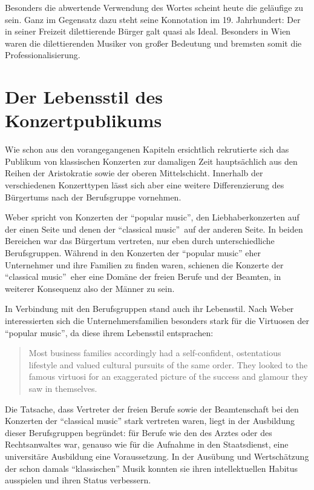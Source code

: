 \documentclass[a4paper, german, oneside]{scrbook}
\begin{document}
Besonders die abwertende Verwendung des Wortes scheint heute die geläufige zu sein. Ganz im Gegensatz dazu steht seine Konnotation im 19. Jahrhundert: Der in seiner Freizeit dilettierende Bürger galt quasi als Ideal. Besonders in Wien waren die dilettierenden Musiker von großer Bedeutung und bremsten somit die Professionalisierung. \parencite[vgl.][88]{weber_music_2004}



\section{Der Lebensstil des Konzertpublikums} %
\label{lebensstil}
Wie schon aus den vorangegangenen Kapiteln ersichtlich rekrutierte sich das Publikum von klassischen Konzerten zur damaligen Zeit hauptsächlich aus den Reihen der Aristokratie sowie der oberen Mittelschicht. Innerhalb der verschiedenen Konzerttypen lässt sich aber eine weitere Differenzierung des Bürgertums nach der Berufsgruppe vornehmen.

Weber spricht von Konzerten der \enquote{popular music}, den Liebhaberkonzerten auf der einen Seite und denen der \enquote{classical music} auf der anderen Seite. In beiden Bereichen war das Bürgertum vertreten, nur eben durch unterschiedliche Berufsgruppen. Während in den Konzerten der \enquote{popular music} eher Unternehmer und ihre Familien zu finden waren, schienen die Konzerte der \enquote{classical music} eher eine Domäne der freien Berufe und der Beamten, in weiterer Konsequenz also der Männer zu sein. \parencite[vgl.][S. 63 und 66]{weber_music_2004}

In Verbindung mit den Berufsgruppen stand auch ihr Lebensstil. Nach Weber interessierten sich die Unternehmersfamilien besonders stark für die Virtuosen der \enquote{popular music}, da diese ihrem Lebensstil entsprachen: \blockquote[{\cite[39]{weber_music_2004}}]{Most business families accordingly had a self-confident, ostentatious lifestyle and valued cultural pursuits of the same order. They looked to the famous virtuosi for an exaggerated picture of the success and glamour they saw in themselves.}

Die Tatsache, dass Vertreter der freien Berufe sowie der Beamtenschaft bei den Konzerten der \enquote{classical music} stark vertreten waren, liegt in der Ausbildung dieser Berufsgruppen begründet: für Berufe wie den des Arztes oder des Rechtsanwaltes war, genauso wie für die Aufnahme in den Staatsdienst, eine universitäre Ausbildung eine Voraussetzung. In der Ausübung und Wertschätzung der schon damals \enquote{klassischen} Musik konnten sie ihren intellektuellen Habitus ausspielen und ihren Status verbessern. \parencite[vgl.][67]{weber_music_2004}
\end{document}
